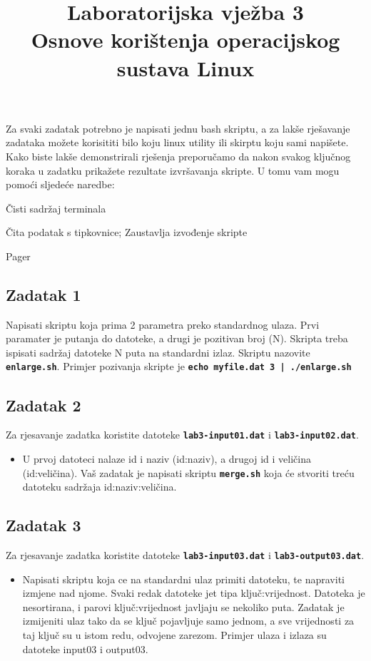 \documentclass[12pt,a4paper]{article}
\newcommand{\shell}[1]{\texttt{\textbf{#1}}}
\begin{document}
	\title{Laboratorijska vježba 3\\{\small Osnove korištenja operacijskog sustava Linux}\vspace{-2em}}
	\maketitle
	Za svaki zadatak potrebno je napisati jednu bash skriptu, a za lakše rješavanje zadataka možete korisititi bilo koju linux utility ili skirptu koju sami napišete. Kako biste lakše demonstrirali rješenja preporučamo da nakon svakog ključnog koraka u zadatku prikažete rezultate izvršavanja skripte. U tomu vam mogu pomoći sljedeće naredbe:
	\begin{description}[leftmargin=!,labelwidth=4em,itemsep=0em]
		\item[\shell{clear}] Čisti sadržaj terminala
		\item[\shell{read -p}] Čita podatak s tipkovnice; Zaustavlja izvođenje skripte
		\item[\shell{less}] Pager
	\end{description}
	
  \subsection*{Zadatak 1}
  Napisati skriptu koja prima 2 parametra preko standardnog ulaza. Prvi paramater je putanja do datoteke, a drugi je pozitivan broj (N).
  Skripta treba ispisati sadržaj datoteke N puta na standardni izlaz. Skriptu nazovite \shell{enlarge.sh}. Primjer pozivanja skripte je \shell{echo myfile.dat 3 | ./enlarge.sh}

	\subsection*{Zadatak 2}
  Za rjesavanje zadatka koristite datoteke \shell{lab3-input01.dat} i \shell{lab3-input02.dat}.
	\begin{itemize}
    \item U prvoj datoteci nalaze id i naziv (id:naziv), a drugoj id i veličina (id:veličina). Vaš zadatak je napisati skriptu \shell{merge.sh} koja će stvoriti treću datoteku sadržaja id:naziv:veličina.
	\end{itemize}
	
	\subsection*{Zadatak 3}
  Za rjesavanje zadatka koristite datoteke \shell{lab3-input03.dat} i \shell{lab3-output03.dat}.
	\begin{itemize}
    \item Napisati skriptu koja ce na standardni ulaz primiti datoteku, te napraviti izmjene nad njome. Svaki redak datoteke jet tipa ključ:vrijednost. Datoteka je nesortirana, i parovi ključ:vrijednost javljaju se nekoliko puta. Zadatak je izmijeniti ulaz tako da se ključ pojavljuje samo jednom, a sve vrijednosti za taj ključ su u istom redu, odvojene zarezom. Primjer ulaza i izlaza su datoteke input03 i output03. 
	\end{itemize}
	
\end{document}
